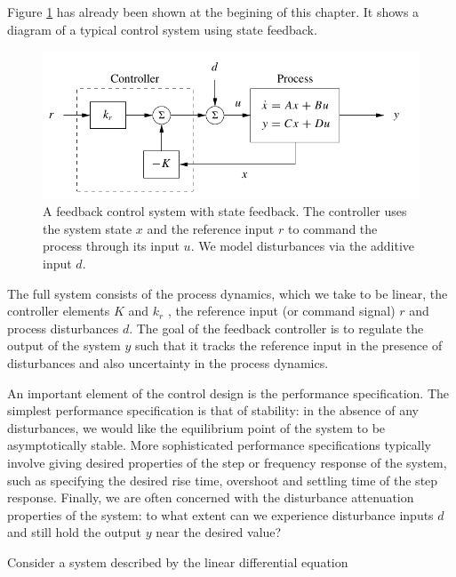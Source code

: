 Figure \ref{state_feedback_sys_II} has already been shown at the begining of this chapter. It shows a diagram of a typical control system using state feedback.


\begin{figure}[!htb]
\begin{center}
\includegraphics[scale=0.280]{img/state_feedback/state_feedback_sys.jpeg}
\end{center}
\caption{A feedback control system with state feedback. The controller uses the system
state $x$ and the reference input $r$ to command the process through its input $u$. We model
disturbances via the additive input $d$.}
\label{state_feedback_sys_II}
\end{figure}

The full system consists of the process dynamics, which we take to be linear, the controller
elements $K$ and $k_r$ , the reference input (or command signal) $r$ and process disturbances $d$. The goal of the feedback controller is to regulate the output of the system $y$ such that it tracks the reference input in the presence of disturbances and also uncertainty in the process dynamics.

An important element of the control design is the performance specification.
The simplest performance specification is that of stability: in the absence of any
disturbances, we would like the equilibrium point of the system to be asymptotically
stable. More sophisticated performance specifications typically involve giving desired properties of the step or frequency response of the system, such as specifying the desired rise time, overshoot and settling time of the step response. Finally, we are often concerned with the disturbance attenuation properties of the system: to
what extent can we experience disturbance inputs $d$ and still hold the output $y$ near the desired value?

Consider a system described by the linear differential equation



